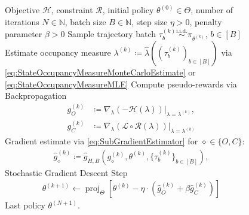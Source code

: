 \documentclass{article}
\theoremstyle{plain}
\theoremstyle{definition}
\theoremstyle{remark}
\def\NN{{\mathbb{N}}}
\newcommand{\penGenNot}{{\mathcal{L}}}
\newcommand{\define}{\coloneqq}
\DeclareMathOperator{\proj}{proj}
\def\xx{{\theta}}
\def\xxZero{\xx^{(0)}}
\def\xxK{\xx^{(k)}}
\def\xxKnext{\xx^{(k+1)}}
\def\xxNnext{\xx^{(N+1)}}
\def\lambdaHat{{\widehat{\lambda}}}
\def\NN{{\mathbb{N}}}
\def\HH{{\mathcal{H}}}
\newcommand{\setm}[1]{[#1]}
\def\XX{{\Theta}}
\def\thetaK{{\theta^{(k)}}}
\def\gApprox{{\hat{g}}}
\def\Reg{{\mathcal{R}}}
\begin{document}
\begin{figure}
 \vspace{-1.3\baselineskip}
 \begin{minipage}{0.54\textwidth}
  \begin{algorithm}[H]
   \begin{algorithmic}[1]
     Objective $\HH$, constraint $\Reg$,
    initial policy $\xxZero \in \XX$, number of iterations $N \in \NN$,
    batch size $B \in \NN$, step size $\eta > 0$,
    penalty parameter $\beta>0$
    \STATE Sample trajectory batch $\tau^{(k)}_b \overset{\text{i.i.d.}}{\sim} \pi_{\theta^{(k)}}$, $b\in\setm{B}$
    \STATE Estimate occupancy measure $\lambda^{(k)} \define
     \lambdaHat((\tau_{b}^{(k)})_{b\in\setm{B}})$ via
    \eqref{eq:StateOccupancyMeasureMonteCarloEstimate} or \eqref{eq:StateOccupancyMeasureMLE}
    \STATE Compute pseudo-rewards via Backpropagation
    \label{AlgoLine:ShadowRewardsGradientComputation}
    \begin{align*}
     g_{O}^{(k)} & \define \nabla_{\lambda} (-\HH(\lambda))\big\vert_{\lambda = \lambda^{(k)}},                 \\
     g_{C}^{(k)} & \define \nabla_{\lambda} (\penGenNot \circ \Reg(\lambda))\big\vert_{\lambda = \lambda^{(k)}}
    \end{align*}
    \vspace{-0.6cm}
    \STATE Gradient estimate via \eqref{eq:SubGradientEstimator} for $\diamond \in \{O, C\}$:
    \begin{align*}
     \gApprox^{(k)}_{\diamond}
     \define \gApprox_{H, B}(g^{(k)}_\diamond, \thetaK,
     \{\tau^{(k)}_b\}_{b\in \setm{B}}),
    \end{align*}
    \vspace{-0.6cm}
    \STATE Stochastic Gradient Descent Step
    \begin{align*}
     \xxKnext \leftarrow \proj_{\Theta}\left[\xxK - \eta \cdot (\gApprox_{O}^{(k)}
      + \beta \gApprox_{C}^{(k)})\right]
    \end{align*}
    \vspace{-0.7cm}
    \ENDFOR
     Last policy $\xxNnext$.
   \end{algorithmic}
   \label{algo:Penalty}
  \end{algorithm}
 \end{minipage}
\end{figure}
\end{document}

